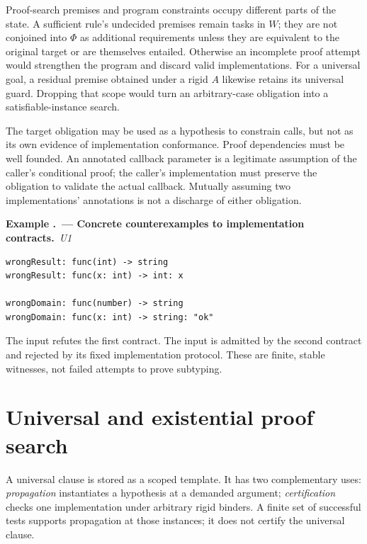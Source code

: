 \documentclass[11pt,a4paper,oneside]{report}
\newcommand{\code}[1]{\texttt{\detokenize{#1}}}
\newcommand{\Uone}{\ensuremath{\profilecal{U}_{1}}}
\def\Uone{U1}%
\theoremstyle{remark}
\newcounter{example}[chapter]
\renewcommand{\theexample}{\thechapter.\arabic{example}}
\newcommand{\example}[2]{\refstepcounter{example}\Needspace{5\baselineskip}\par\textbf{Example \theexample\ --- #1.}\ \textit{#2}\par\nopagebreak[4]}
\begin{document}
Proof-search premises and program constraints occupy different parts of the
state. A sufficient rule's undecided premises remain tasks in $W$; they are not
conjoined into $\Phi$ as additional requirements unless they are equivalent to
the original target or are themselves entailed. Otherwise an incomplete proof
attempt would strengthen the program and discard valid implementations.
For a universal goal, a residual premise obtained under a rigid $A$ likewise
retains its universal guard. Dropping that scope would turn an arbitrary-case
obligation into a satisfiable-instance search.

The target obligation may be used as a hypothesis to constrain calls, but not
as its own evidence of implementation conformance. Proof dependencies must be
well founded. An annotated callback parameter is a legitimate assumption of the
caller's conditional proof; the caller's implementation must preserve the
obligation to validate the actual callback. Mutually assuming two implementations'
annotations is not a discharge of either obligation.

\example{Concrete counterexamples to implementation contracts}{\Uone{}}
\par\noindent\begin{minipage}{\linewidth}
\begin{lstlisting}
wrongResult: func(int) -> string
wrongResult: func(x: int) -> int: x

wrongDomain: func(number) -> string
wrongDomain: func(x: int) -> string: "ok"
\end{lstlisting}
\end{minipage}\par
The input \code{0} refutes the first contract. The input \code{1.5} is admitted
by the second contract and rejected by its fixed implementation protocol.
These are finite, stable witnesses, not failed attempts to prove subtyping.

\section{Universal and existential proof search}
A universal clause is stored as a scoped template. It has two complementary uses:
\emph{propagation} instantiates a hypothesis at a demanded argument;
\emph{certification} checks one implementation under arbitrary rigid binders.
A finite set of successful tests supports propagation at those instances; it
does not certify the universal clause.
\end{document}
